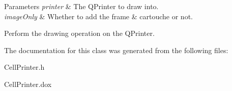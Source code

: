 \begin{DoxyParams}{Parameters}
{\em printer} & The Q\+Printer to draw into. \\
\hline
{\em image\+Only} & Whether to add the frame \& cartouche or not.\\
\hline
\end{DoxyParams}
Perform the drawing operation on the Q\+Printer. 

The documentation for this class was generated from the following files\+:\begin{DoxyCompactItemize}
\item 
Cell\+Printer.\+h\item 
Cell\+Printer.\+dox\end{DoxyCompactItemize}
